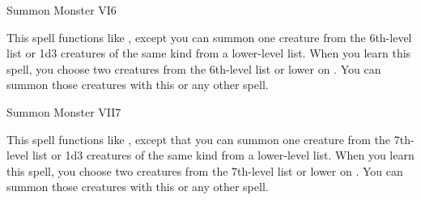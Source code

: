\begin{spellsection}{Summon Monster VI}{6}
    \begin{spellheader}
    \end{spellheader}
    \begin{spellcontent}
        \begin{spelltargetinginfo}
        \end{spelltargetinginfo}
        \begin{spelleffects}
            \spellspecial This spell functions like , except you can summon one creature from the 6th-level list or 1d3 creatures of the same kind from a lower-level list. When you learn this spell, you choose two creatures from the 6th-level list or lower on . You can summon those creatures with this or any other  spell.
            \spelldur \durshort \dismissable
        \end{spelleffects}
    \end{spellcontent}
    \begin{spellfooter}
        \miscastexplode
    \end{spellfooter}
\end{spellsection}

\begin{spellsection}{Summon Monster VII}{7}
    \begin{spellheader}
    \end{spellheader}
    \begin{spellcontent}
        \begin{spelltargetinginfo}
        \end{spelltargetinginfo}
        \begin{spelleffects}
            \spellspecial This spell functions like , except that you can summon one creature from the 7th-level list or 1d3 creatures of the same kind from a lower-level list. When you learn this spell, you choose two creatures from the 7th-level list or lower on . You can summon those creatures with this or any other  spell.
            \spelldur \durshort \dismissable
        \end{spelleffects}
    \end{spellcontent}
    \begin{spellfooter}
        \miscastexplode
    \end{spellfooter}
\end{spellsection}


